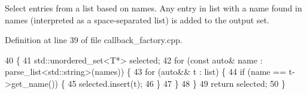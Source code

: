 Select entries from a list based on names. Any entry in \textquotesingle{}list\textquotesingle{} with a name found in \textquotesingle{}names\textquotesingle{} (interpreted as a space-\/separated list) is added to the output set. 

Definition at line 39 of file callback\+\_\+factory.\+cpp.


\begin{DoxyCode}
40                                                             \{
41   std::unordered\_set<T*> selected;
42   \textcolor{keywordflow}{for} (\textcolor{keyword}{const} \textcolor{keyword}{auto}& name : parse\_list<std::string>(names)) \{
43     \textcolor{keywordflow}{for} (\textcolor{keyword}{auto}&& t : list) \{
44       \textcolor{keywordflow}{if} (name == t->get\_name()) \{
45         selected.insert(t);
46       \}
47     \}
48   \}
49   \textcolor{keywordflow}{return} selected;
50 \}
\end{DoxyCode}
